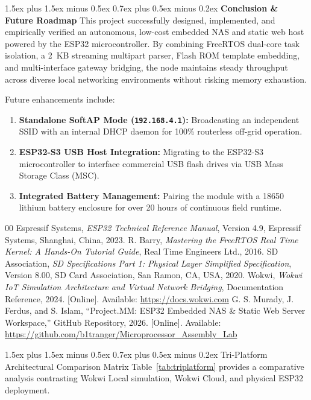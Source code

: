 ﻿\documentclass[conference]{IEEEtran}
\makeatletter
\renewcommand\section{\@startsection{section}{1}{\z@}%
  {1.5ex plus 1.5ex minus 0.5ex}%
  {0.7ex plus 0.5ex minus 0.2ex}%
  {\normalfont\normalsize\bfseries\centering}}
\makeatother
\begin{document}
\section{\textbf{Conclusion \& Future Roadmap}}
This project successfully designed, implemented, and empirically verified an autonomous, low-cost embedded NAS and static web host powered by the ESP32 microcontroller. By combining FreeRTOS dual-core task isolation, a 2~KB streaming multipart parser, Flash ROM template embedding, and multi-interface gateway bridging, the node maintains steady throughput across diverse local networking environments without risking memory exhaustion.

Future enhancements include:
\begin{enumerate}
    \item \textbf{Standalone SoftAP Mode (\texttt{192.168.4.1}):} Broadcasting an independent SSID with an internal DHCP daemon for 100\% routerless off-grid operation.
    \item \textbf{ESP32-S3 USB Host Integration:} Migrating to the ESP32-S3 microcontroller to interface commercial USB flash drives via USB Mass Storage Class (MSC).
    \item \textbf{Integrated Battery Management:} Pairing the module with a 18650 lithium battery enclosure for over 20 hours of continuous field runtime.
\end{enumerate}

\begin{thebibliography}{00}
 Espressif Systems, \textit{ESP32 Technical Reference Manual}, Version 4.9, Espressif Systems, Shanghai, China, 2023.
 R. Barry, \textit{Mastering the FreeRTOS Real Time Kernel: A Hands-On Tutorial Guide}, Real Time Engineers Ltd., 2016.
 SD Association, \textit{SD Specifications Part 1: Physical Layer Simplified Specification}, Version 8.00, SD Card Association, San Ramon, CA, USA, 2020.
 Wokwi, \textit{Wokwi IoT Simulation Architecture and Virtual Network Bridging}, Documentation Reference, 2024. [Online]. Available: \url{https://docs.wokwi.com}
 G. S. Murady, J. Ferdus, and S. Islam, ``Project.MM: ESP32 Embedded NAS \& Static Web Server Workspace,'' GitHub Repository, 2026. [Online]. Available: \url{https://github.com/b1tranger/Microprocessor_Assembly_Lab}
\end{thebibliography}

\appendices

\section{Tri-Platform Architectural Comparison Matrix}
Table~\ref{tab:triplatform} provides a comparative analysis contrasting Wokwi Local simulation, Wokwi Cloud, and physical ESP32 deployment.
\end{document}
